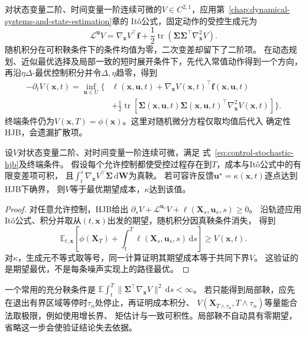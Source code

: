 对状态变量二阶、时间变量一阶连续可微的$V\in C^{2,1}$，应用第~\ref{chap:dynamical-systems-and-state-estimation}章的
Itô公式，固定动作的受控生成元为
\[
  \mathcal L^{\bm u}V=
  \nabla_{\bm x}V^\top\bm f+
  \frac12\operatorname{tr}
    (\bm\Sigma\bm\Sigma^\top\nabla_{\bm x}^2V).
\]
随机积分在可积鞅条件下的条件均值为零，二次变差却留下了二阶项。
在动态规划、近似最优选择及局部一致的短时展开条件下，先代入常值动作得到一个方向，
再沿$\eta\Delta$-最优控制积分并令$\Delta,\eta$趋零，得到
\begin{equation}
  \begin{aligned}
  -\partial_tV(\bm x,t)=\inf_{\bm u\in U}\biggl\{&
    \ell(\bm x,\bm u,t)+
    \nabla_{\bm x}V(\bm x,t)^\top\bm f(\bm x,\bm u,t)\\
    &+\frac12\operatorname{tr}\!\left[
      \bm\Sigma(\bm x,\bm u,t)\bm\Sigma(\bm x,\bm u,t)^\top
      \nabla_{\bm x}^2V(\bm x,t)\right]\biggr\}.
  \end{aligned}
  \label{eq:control-stochastic-hjb}
\end{equation}
终端条件仍为$V(\bm x,T)=\phi(\bm x)$。这里对随机微分方程仅取均值后代入
确定性HJB，会遗漏扩散项。

\begin{theorem}[随机HJB验证]
\label{thm:control-stochastic-hjb-verification}
设$V$对状态变量二阶、对时间变量一阶连续可微，满足
式~\eqref{eq:control-stochastic-hjb}及终端条件。
假设每个允许控制都使受控过程存在到$T$，成本与Itô公式中的有限变差项可积，
且$\int_t^s\nabla_{\bm x}V^\top\bm\Sigma\,\mathrm d\bm W$为真鞅。
若可容许反馈$\bm u^\star=\kappa(\bm x,t)$逐点达到HJB下确界，
则$V$等于最优期望成本，$\kappa$达到该值。
\end{theorem}
\begin{proof}
对任意允许控制，HJB给出
$\partial_sV+\mathcal L^{\bm u_s}V+\ell(\bm X_s,\bm u_s,s)\geq0$。
沿轨迹应用Itô公式、积分并取从$(t,\bm x)$出发的期望，随机积分因真鞅条件消失，
得到
\[
  \mathbb E_{t,\bm x}\left[
    \phi(\bm X_T)+\int_t^T\ell(\bm X_s,\bm u_s,s)\,\mathrm ds\right]
  \geq V(\bm x,t).
\]
对$\kappa$，生成元不等式取等号，同一计算证明其期望成本等于共同下界$V$。
这验证的是期望最优，不是每条噪声实现上的路径最优。
\end{proof}

一个常用的充分鞅条件是
$\mathbb E\int_t^T\lVert\bm\Sigma^\top\nabla_{\bm x}V\rVert^2\,\mathrm ds<\infty$。
若只能得到局部鞅，应先在退出有界区域等停时$\tau_n$处停止，再证明成本积分、
$V(\bm X_{T\wedge\tau_n},T\wedge\tau_n)$等量能合法取极限，例如使用增长界、
矩估计与一致可积性。局部鞅不自动具有零期望，省略这一步会使验证结论失去依据。

